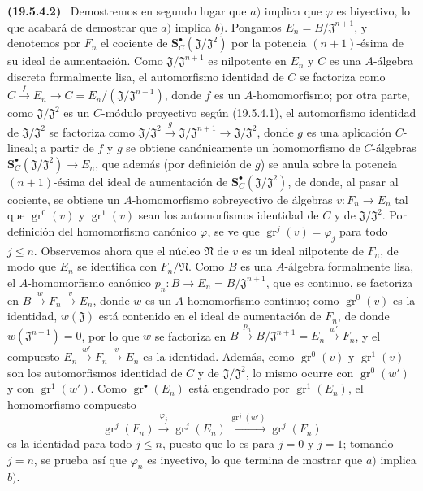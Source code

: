 \documentclass[10pt,oneside]{book}
\makeatletter
\newcommand{\gr}{\operatorname{gr}}
\newcommand{\setmanualcurrentlabel}[1]{\def\@currentlabel{#1}}
\newenvironment{env}[1][]{\setmanualcurrentlabel{#1}\par\medskip\noindent\textbf{(#1)}\ }{\par}
\makeatother
\begin{document}
\begin{env}[19.5.4.2]
\label{0.19.5.4.2-es}
Demostremos en segundo lugar que $a)$ implica que $\varphi$ es biyectivo, lo que
acabará de demostrar que $a)$ implica $b)$. Pongamos
$E_n=B/\mathfrak J^{n+1}$, y denotemos por $F_n$ el cociente de
$\mathbf S_C^\bullet(\mathfrak J/\mathfrak J^2)$ por la potencia $(n+1)$-ésima de
su ideal de aumentación. Como $\mathfrak J/\mathfrak J^{n+1}$ es nilpotente
en $E_n$ y $C$ es una $A$-álgebra discreta formalmente lisa,
el automorfismo identidad de $C$ se factoriza como
$C\xrightarrow{f}E_n\to C=E_n/(\mathfrak J/\mathfrak J^{n+1})$, donde $f$ es un
$A$-homomorfismo; por otra parte, como $\mathfrak J/\mathfrak J^2$ es un
$C$-módulo proyectivo según (19.5.4.1), el automorfismo identidad de
$\mathfrak J/\mathfrak J^2$ se factoriza como
$\mathfrak J/\mathfrak J^2\xrightarrow{g}\mathfrak J/\mathfrak J^{n+1}
\to\mathfrak J/\mathfrak J^2$, donde $g$ es una aplicación $C$-lineal; a
partir de $f$ y $g$ se obtiene canónicamente un homomorfismo de $C$-álgebras
$\mathbf S_C^\bullet(\mathfrak J/\mathfrak J^2)\to E_n$, que además (por
definición de $g$) se anula sobre la potencia $(n+1)$-ésima del ideal
de aumentación de $\mathbf S_C^\bullet(\mathfrak J/\mathfrak J^2)$, de donde, al
pasar al cociente, se obtiene un $A$-homomorfismo sobreyectivo de álgebras
$v:F_n\to E_n$ tal que $\gr^0(v)$ y $\gr^1(v)$ sean los automorfismos
identidad de $C$ y de $\mathfrak J/\mathfrak J^2$. Por definición del
homomorfismo canónico $\varphi$, se ve que $\gr^j(v)=\varphi_j$ para todo
$j\leq n$. Observemos ahora que el núcleo $\mathfrak N$ de $v$ es un ideal
nilpotente de $F_n$, de modo que $E_n$ se identifica con $F_n/\mathfrak N$. Como
$B$ es una $A$-álgebra formalmente lisa, el $A$-homomorfismo canónico
$p_n:B\to E_n=B/\mathfrak J^{n+1}$, que es continuo, se factoriza en
$B\xrightarrow{w}F_n\xrightarrow{v}E_n$, donde $w$ es un $A$-homomorfismo
continuo; como $\gr^0(v)$ es la identidad, $w(\mathfrak J)$ está contenido en
el ideal de aumentación de $F_n$, de donde $w(\mathfrak J^{n+1})=0$, por lo que
$w$ se factoriza en
$B\xrightarrow{p_n}B/\mathfrak J^{n+1}=E_n\xrightarrow{w'}F_n$, y el compuesto
$E_n\xrightarrow{w'}F_n\xrightarrow{v}E_n$ es la identidad. Además, como
$\gr^0(v)$ y $\gr^1(v)$ son los automorfismos identidad de $C$ y de
$\mathfrak J/\mathfrak J^2$, lo mismo ocurre con $\gr^0(w')$ y con
$\gr^1(w')$. Como $\gr^\bullet(E_n)$ está engendrado por $\gr^1(E_n)$, el
homomorfismo compuesto
\[
  \gr^j(F_n)\xrightarrow{\varphi_j}\gr^j(E_n)
  \xrightarrow{\gr^j(w')}\gr^j(F_n)
\]
es la identidad para todo $j\leq n$, puesto que lo es para $j=0$ y $j=1$;
tomando $j=n$, se prueba así que $\varphi_n$ es inyectivo, lo que termina de
mostrar que $a)$ implica $b)$.
\end{env}
\end{document}

